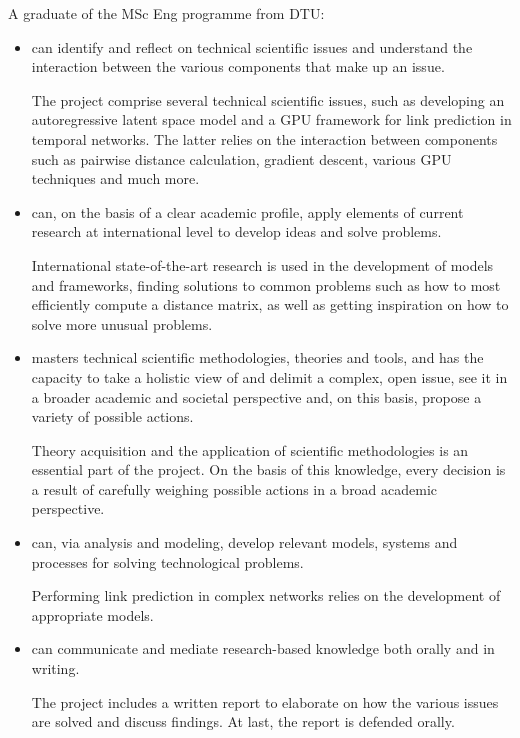 \documentclass[]{article}
\begin{document}
A graduate of the MSc Eng programme from DTU:
\begin{itemize}
    \item can identify and reflect on technical scientific issues and understand the interaction between the various components that make up an issue.\par
    The project comprise several technical scientific issues, such as developing an autoregressive latent space model and a GPU framework for link prediction in temporal networks. The latter relies on the interaction between components such as pairwise distance calculation, gradient descent, various GPU techniques and much more.
    
    \item can, on the basis of a clear academic profile, apply elements of current research at international level to develop ideas and solve problems.\par
    International state-of-the-art research is used in the development of models and frameworks, finding solutions to common problems such as how to most efficiently compute a distance matrix, as well as getting inspiration on how to solve more unusual problems.
    
    \item masters technical scientific methodologies, theories and tools, and has the capacity to take a holistic view of and delimit a complex, open issue, see it in a broader academic and societal perspective and, on this basis, propose a variety of possible actions.\par
    Theory acquisition and the application of scientific methodologies is an essential part of the project. On the basis of this knowledge, every decision is a result of carefully weighing possible actions in a broad academic perspective.
    
    \item can, via analysis and modeling, develop relevant models, systems and processes for solving technological problems.\par
    Performing link prediction in complex networks relies on the development of appropriate models.
    
    \item can communicate and mediate research-based knowledge both orally and in writing.\par
    The project includes a written report to elaborate on how the various issues are solved and discuss findings. At last, the report is defended orally.
    

\end{itemize}
\end{document}
